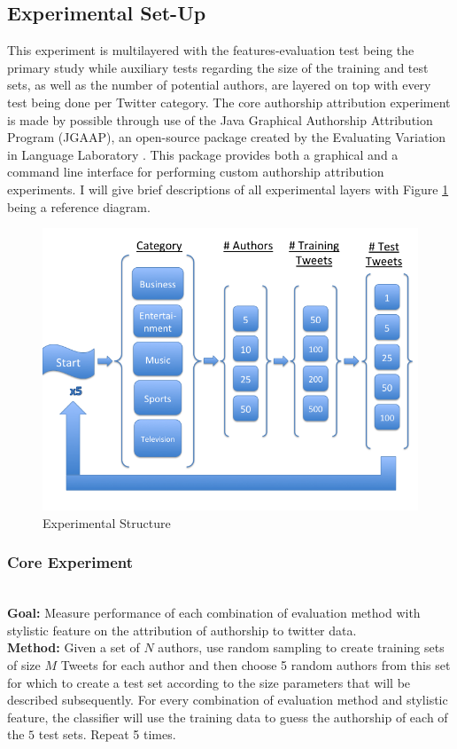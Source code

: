 \documentclass[pageno]{jpaper}
\begin{document}
\subsection{Experimental Set-Up}
\label{sec:experimentalSetUp}
This experiment is multilayered with the features-evaluation test being the primary study while auxiliary tests regarding the size of the training and test sets, as well as the number of potential authors, are layered on top with every test being done per Twitter category.  The core authorship attribution experiment is made by possible through use of the Java Graphical Authorship Attribution Program (JGAAP), an open-source package created by the Evaluating Variation in Language Laboratory \cite{JGAAP}.   This package provides both a graphical and a command line interface for performing custom authorship attribution experiments.  I will give brief descriptions of all experimental layers with Figure \ref{fig:experimentStructure} being a reference diagram.
\begin{figure}[h!]
\begin{center}
\includegraphics*[scale=.5]{experimentStructure}
\end{center}
\caption{Experimental Structure}
\label{fig:experimentStructure}
\end{figure}
\subsubsection{Core Experiment} 
\label{sec:coreExperiment}
\indent
\\
\textbf{Goal:} Measure performance of each combination of evaluation method with stylistic feature on the attribution of authorship to twitter data.
\\
\textbf{Method:} Given a set of $N$ authors, use random sampling to create training sets of size $M$ Tweets for each author and then choose 5 random authors from this set for which to create a test set according to the size parameters that will be described subsequently.  For every combination of evaluation method and stylistic feature, the classifier will use the training data to guess the authorship of each of the $5$ test sets.  Repeat 5 times.
\end{document}
